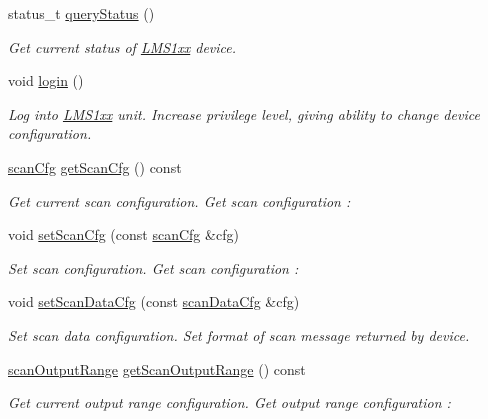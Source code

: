 \begin{DoxyCompactItemize}
status\+\_\+t \hyperlink{classLMS1xx_a6edfc1caa0a9788375ca6d9e6025dc2f}{query\+Status} ()
\begin{DoxyCompactList}\small\item\em Get current status of \hyperlink{classLMS1xx}{L\+M\+S1xx} device. \end{DoxyCompactList}\item 
\mbox{\label{classLMS1xx_ab06186d507e737522287f3f22cc8e6d0}} 
void \hyperlink{classLMS1xx_ab06186d507e737522287f3f22cc8e6d0}{login} ()
\begin{DoxyCompactList}\small\item\em Log into \hyperlink{classLMS1xx}{L\+M\+S1xx} unit. Increase privilege level, giving ability to change device configuration. \end{DoxyCompactList}\item 
\hyperlink{structscanCfg}{scan\+Cfg} \hyperlink{classLMS1xx_ac24aca9ae9b4329c6455fb1ad2a6faad}{get\+Scan\+Cfg} () const
\begin{DoxyCompactList}\small\item\em Get current scan configuration. Get scan configuration \+: \end{DoxyCompactList}\item 
void \hyperlink{classLMS1xx_aa0feadf2fefe3c8145d9cb67d02f058c}{set\+Scan\+Cfg} (const \hyperlink{structscanCfg}{scan\+Cfg} \&cfg)
\begin{DoxyCompactList}\small\item\em Set scan configuration. Get scan configuration \+: \end{DoxyCompactList}\item 
void \hyperlink{classLMS1xx_ac8cdbf56a26b60f8cf202d307e57f08c}{set\+Scan\+Data\+Cfg} (const \hyperlink{structscanDataCfg}{scan\+Data\+Cfg} \&cfg)
\begin{DoxyCompactList}\small\item\em Set scan data configuration. Set format of scan message returned by device. \end{DoxyCompactList}\item 
\hyperlink{structscanOutputRange}{scan\+Output\+Range} \hyperlink{classLMS1xx_a89b61570421cabe5e57b2f8596c25673}{get\+Scan\+Output\+Range} () const
\begin{DoxyCompactList}\small\item\em Get current output range configuration. Get output range configuration \+: \end{DoxyCompactList}\item 

\end{DoxyCompactItemize}
